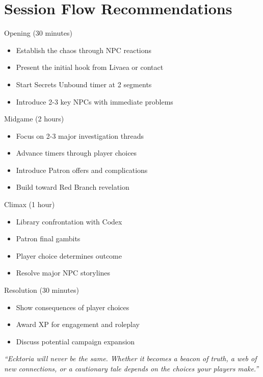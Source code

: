 \documentclass[11pt]{article}
\begin{document}
\section*{Session Flow Recommendations}

\begin{mechanicsbox}{Opening (30 minutes)}
\begin{itemize}
    \item Establish the chaos through NPC reactions
    \item Present the initial hook from Livaea or contact
    \item Start Secrets Unbound timer at 2 segments
    \item Introduce 2-3 key NPCs with immediate problems
\end{itemize}
\end{mechanicsbox}

\begin{mechanicsbox}{Midgame (2 hours)}
\begin{itemize}
    \item Focus on 2-3 major investigation threads
    \item Advance timers through player choices
    \item Introduce Patron offers and complications
    \item Build toward Red Branch revelation
\end{itemize}
\end{mechanicsbox}

\begin{mechanicsbox}{Climax (1 hour)}
\begin{itemize}
    \item Library confrontation with Codex
    \item Patron final gambits
    \item Player choice determines outcome
    \item Resolve major NPC storylines
\end{itemize}
\end{mechanicsbox}

\begin{mechanicsbox}{Resolution (30 minutes)}
\begin{itemize}
    \item Show consequences of player choices
    \item Award XP for engagement and roleplay
    \item Discuss potential campaign expansion
\end{itemize}
\end{mechanicsbox}

\begin{center}
    \textit{``Ecktoria will never be the same. Whether it becomes a beacon of truth, a web of new connections, or a cautionary tale depends on the choices your players make.''}
\end{center}


\end{document}
